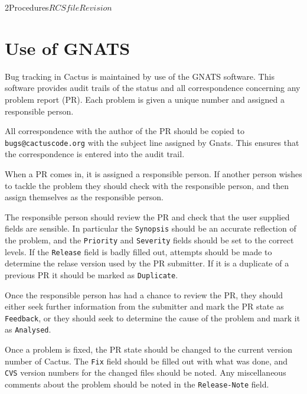 \begin{cactuspart}{2}{Procedures}{$RCSfile$}{$Revision$}

\chapter{Use of GNATS}

Bug tracking in Cactus is maintained by use of the GNATS software.
This software provides audit trails of the status and all
correspondence concerning any problem report (PR).  Each problem is
given a unique number and assigned a responsible person.

\begin{Lentry}
\item[{\em Correspondence}]
All correspondence with the author of the PR should be copied to {\tt
\verb,bugs@cactuscode.org,} with the subject line assigned by Gnats.
This ensures that the correspondence is entered into the audit trail.
\item[{\em Responsiblity}]
When a PR comes in, it is assigned a responsible person.  If another
person wishes to tackle the problem they should check with the
responsible person, and then assign themselves as the responsible
person.
\item[{\em Initial auditing}]
The responsible person should review the PR and check that the user
supplied fields are sensible.  In particular the {\tt Synopsis} should
be an accurate reflection of the problem, and the {\tt Priority} and
{\tt Severity} fields should be set to the correct levels.  If the
{\tt Release} field is badly filled out, attempts should be made to
determine the relase version used by the PR submitter.  If it is a
duplicate of a previous PR it should be marked as {\tt Duplicate}.
\item[{\em Analysing the PR}]
Once the responsible person has had a chance to review the PR, they
should either seek further information from the submitter and mark the 
PR state as {\tt Feedback}, or they should seek to determine the cause 
of the problem and mark it as {\tt Analysed}.
\item[{\em Closing a PR}]
Once a problem is fixed, the PR state should be changed to the current 
version number of Cactus.  The {\tt Fix} field should be filled out
with what was done, and {\tt CVS} version numbers for the changed
files should be noted.  Any miscellaneous comments about the problem
should be noted in the {\tt Release-Note} field.
\end{Lentry}



\end{cactuspart}
